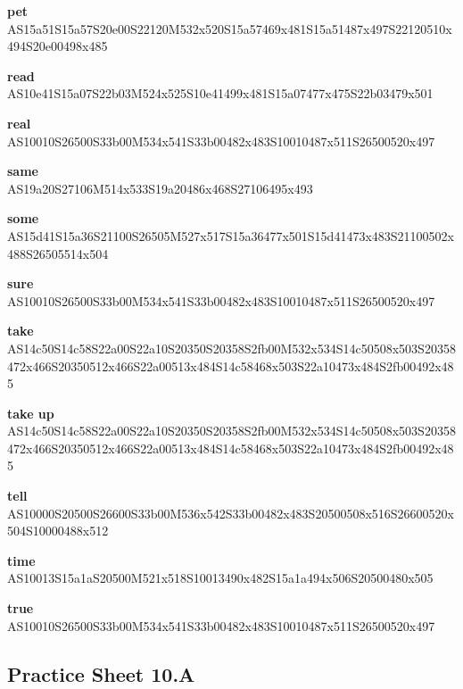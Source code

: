 \documentclass{article}
\begin{document}
\begin{glossary}
\textbf{pet}\\
AS15a51S15a57S20e00S22120M532x520S15a57469x481S15a51487x497S22120510x494S20e00498x485

\textbf{read}\\
AS10e41S15a07S22b03M524x525S10e41499x481S15a07477x475S22b03479x501

\textbf{real}\\
AS10010S26500S33b00M534x541S33b00482x483S10010487x511S26500520x497

\textbf{same}\\
AS19a20S27106M514x533S19a20486x468S27106495x493

\textbf{some}\\
AS15d41S15a36S21100S26505M527x517S15a36477x501S15d41473x483S21100502x488S26505514x504

\textbf{sure}\\
AS10010S26500S33b00M534x541S33b00482x483S10010487x511S26500520x497

\textbf{take}\\
AS14c50S14c58S22a00S22a10S20350S20358S2fb00M532x534S14c50508x503S20358472x466S20350512x466S22a00513x484S14c58468x503S22a10473x484S2fb00492x485

\textbf{take up}\\
AS14c50S14c58S22a00S22a10S20350S20358S2fb00M532x534S14c50508x503S20358472x466S20350512x466S22a00513x484S14c58468x503S22a10473x484S2fb00492x485

\textbf{tell}\\
AS10000S20500S26600S33b00M536x542S33b00482x483S20500508x516S26600520x504S10000488x512

\textbf{time}\\
AS10013S15a1aS20500M521x518S10013490x482S15a1a494x506S20500480x505

\textbf{true}\\
AS10010S26500S33b00M534x541S33b00482x483S10010487x511S26500520x497

\end{glossary}

\subsection{Practice Sheet 10.A}
\end{document}
